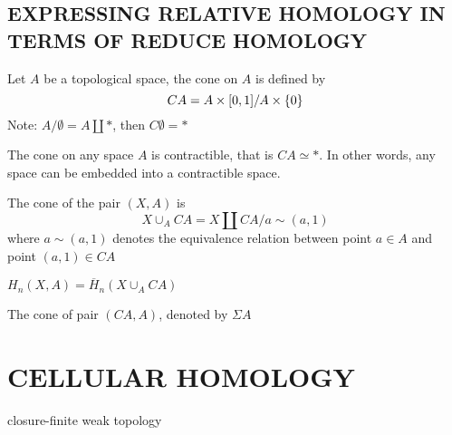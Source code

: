\documentclass{report}
\begin{document}
\subsection{EXPRESSING RELATIVE HOMOLOGY IN TERMS OF REDUCE HOMOLOGY}

\begin{definition}[cone]
    Let $A$ be a topological space, the cone on $A$ is defined by 
    $$
        CA = A \times [0, 1] / A \times \{0\}
    $$
    Note: $A / \emptyset = A \amalg *$, then $C \emptyset = *$
\end{definition}

\begin{lemma}
    The cone on any space $A$ is contractible, that is $CA \simeq *$. In other words, any space can be embedded into a contractible space.
\end{lemma}

\begin{longproof}
\end{longproof}

\begin{definition}
    The cone of the pair $(X, A)$ is
    $$
        X \cup_A CA = X \amalg CA / a \sim (a, 1)
    $$
    where $a \sim (a, 1)$ denotes the equivalence relation between point $a \in A$ and point $(a, 1) \in CA$
\end{definition}

\begin{proposition}
    $H_n(X, A) = \overline{H}_n(X \cup_A CA)$
\end{proposition}

\begin{longproof}
\end{longproof}

\begin{definition}[suspension]
    The cone of pair $(CA, A)$, denoted by $\Sigma A$
\end{definition}


\section{CELLULAR HOMOLOGY}
closure-finite weak topology 
\end{document}
